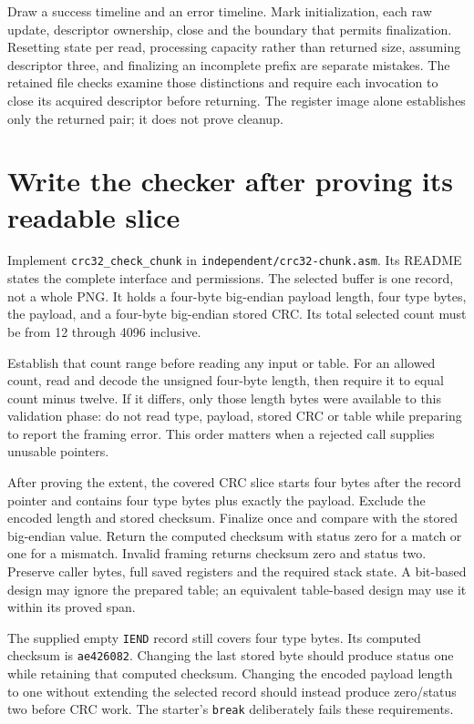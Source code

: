 Draw a success timeline and an error timeline. Mark initialization, each raw
update, descriptor ownership, close and the boundary that permits finalization.
Resetting state per read, processing capacity rather than returned size, assuming
descriptor three, and finalizing an incomplete prefix are separate mistakes.
The retained file checks examine those distinctions and require each invocation
to close its acquired descriptor before returning. The register image alone
establishes only the returned pair; it does not prove cleanup.

\section{Write the checker after proving its readable slice}

Implement \texttt{crc32\_check\_chunk} in
\texttt{independent/\allowbreak crc32-chunk.asm}. Its README states the complete
interface and permissions. The selected buffer is one record, not a whole PNG.
It holds a four-byte big-endian payload length, four type bytes, the payload,
and a four-byte big-endian stored CRC. Its total selected count must be from
12 through 4096 inclusive.

Establish that count range before reading any input or table. For an allowed
count, read and decode the unsigned four-byte length, then require it to equal
count minus twelve. If it differs, only those length bytes were available to
this validation phase: do not read type, payload, stored CRC or table while
preparing to report the framing error. This order matters when a rejected call
supplies unusable pointers.

After proving the extent, the covered CRC slice starts four bytes after the
record pointer and contains four type bytes plus exactly the payload. Exclude
the encoded length and stored checksum. Finalize once and compare with the
stored big-endian value. Return the computed checksum with status zero for a
match or one for a mismatch. Invalid framing returns checksum zero and status
two. Preserve caller bytes, full saved registers and the required stack state.
A bit-based design may ignore the prepared table; an equivalent table-based
design may use it within its proved span.

The supplied empty \texttt{IEND} record still covers four type bytes. Its computed
checksum is \texttt{ae426082}. Changing the last stored byte should produce
status one while retaining that computed checksum. Changing the encoded payload
length to one without extending the selected record should instead produce
zero/status two before CRC work. The starter's \texttt{break} deliberately fails
these requirements.

